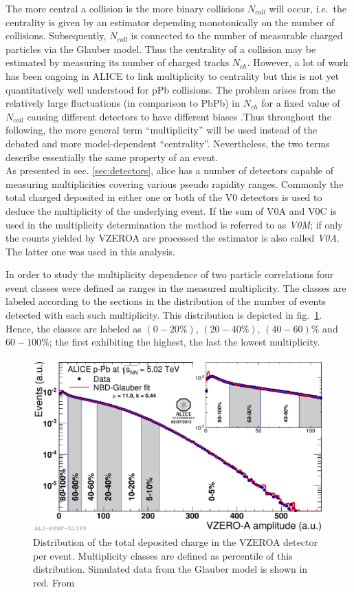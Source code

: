The more central a collision is the more binary collisions $N_{coll}$ will occur, i.e.\ the centrality is given by an estimator depending monotonically on the number of collisions. Subsequently, $N_{coll}$ is connected to the number of measurable charged particles via the Glauber model. Thus the centrality of a collision may be estimated by measuring its number of charged tracks $N_{ch}$. However, a lot of work has been ongoing in ALICE to link multiplicity to centrality but this is not yet quantitatively well understood for \gls{pPb} collisions. The problem arises from the relatively large fluctuations (in comparison to \gls{PbPb}) in $N_{ch}$ for a fixed value of $N_{coll}$ causing different detectors to have different biases \cite{Morsch2013}.Thus throughout the following, the more general term ``multiplicity'' will be used instead of the debated and more model-dependent ``centrality''. Nevertheless, the two terms describe essentially the same property of an event.\\

As presented in sec. \ref{sec:detectors}, \gls{alice} has a number of detectors capable of measuring multiplicities covering various pseudo rapidity ranges. Commonly the total charged deposited in either one or both of the V0 detectors is used to deduce the multiplicity of the underlying event. If the sum of  V0A and V0C is used in the multiplicity determination the method is referred to as \emph{V0M}; if only the counts yielded by VZEROA are processed the estimator is also called \emph{V0A}. The latter one was used in this analysis.


In order to study the multiplicity dependence of two particle correlations four event classes were defined as ranges in the measured multiplicity. The classes are labeled according to the sections in the distribution of the number of events detected with each such multiplicity. This distribution is depicted in fig.~\ref{fig:V0A_dist}. Hence, the classes are labeled as $(0-20\%)$, $(20-40\%)$, $(40-60)\%$ and $60-100\%$; the first exhibiting the highest, the last the lowest multiplicity. 

\begin{figure}
  \centering
  \includegraphics[width=.8\textwidth]{figures/cent_V0A.pdf}
  \caption[Distribution of the total deposited charge in the VZEROA detector per event.]{Distribution of the total deposited charge in the VZEROA detector per event. Multiplicity classes are defined as percentile of this distribution. Simulated data from the Glauber model is shown in red. From \cite{V0Acent2013}}
  \label{fig:V0A_dist}
\end{figure}

